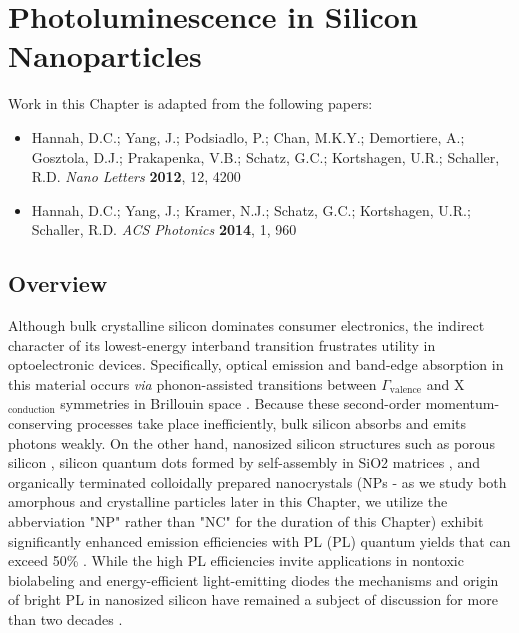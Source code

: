 \chapter{Photoluminescence in Silicon Nanoparticles}

Work in this Chapter is adapted from the following papers:
\begin{itemize}
\item Hannah, D.C.; Yang, J.; Podsiadlo, P.; Chan, M.K.Y.; Demortiere, A.; Gosztola, D.J.; Prakapenka, V.B.; Schatz, G.C.; Kortshagen, U.R.; Schaller, R.D. \emph{Nano Letters} \textbf{2012}, 12, 4200
\item Hannah, D.C.; Yang, J.; Kramer, N.J.; Schatz, G.C.; Kortshagen, U.R.; Schaller, R.D. \emph{ACS Photonics} \textbf{2014}, 1, 960
\end{itemize}
\section{Overview}

Although bulk crystalline silicon dominates consumer electronics, the indirect character of its lowest-energy interband transition frustrates utility in optoelectronic devices. Specifically, optical emission and band-edge absorption in this material occurs \emph{via} phonon-assisted transitions between $\Gamma_{\mathrm{valence}}$  and X$_{\mathrm{conduction}}$ symmetries in Brillouin space \cite{hull1999properties}. Because these second-order momentum-conserving processes take place inefficiently, bulk silicon absorbs and emits photons weakly. On the other hand, nanosized silicon structures such as porous silicon \cite{canham1990silicon}, silicon quantum dots formed by self-assembly in SiO2 matrices \cite{shimizu1998optical,zacharias2002size}, and organically terminated colloidally prepared nanocrystals (NPs - as we study both amorphous and crystalline particles later in this Chapter, we utilize the abberviation "NP" rather than "NC" for the duration of this Chapter) \cite{mangolini2007plasma,erogbogbo2010vivo,mangolini2005high,pettigrew2003solution,hessel2011synthesis,holmes2001highly,atkins2011femtosecond} exhibit significantly enhanced emission efficiencies with PL (PL) quantum yields that can exceed 50\% \cite{PhysRevB.80.115407,jurbergs2006silicon,Wilson19111993}.  While the high PL efficiencies invite applications in nontoxic biolabeling \cite{erogbogbo2010vivo} and energy-efficient light-emitting diodes \cite{ng2001efficient,cheng2011high} the mechanisms and origin of bright PL in nanosized silicon have remained a subject of discussion for more than two decades \cite{canham1990silicon, PhysRevB.49.16845,PhysRevLett.88.097401,reboredo2005theory,
de2010red,PhysRevB.61.4485,cullis1991visible,PhysRevLett.100.067401,saar2009PL,kovalev1999optical,PhysRevLett.72.1514,PhysRevLett.81.2803, godefroo2008classification}. \par


